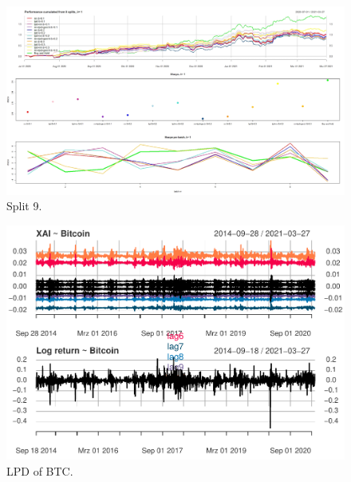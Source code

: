 \documentclass[
]{article}
\begin{document}
\begin{figure}

{\centering \includegraphics[width=0.9\linewidth]{images/xailpd/lambda_1_with0_5/all} 

}

\caption{Split 9.}\label{fig:all1_05}
\end{figure}

\begin{figure}

{\centering \includegraphics[width=1\linewidth]{00_main_files/figure-latex/xai_plot2-1} 

}

\caption{LPD of BTC.}\label{fig:xai_plot2}
\end{figure}
\end{document}
